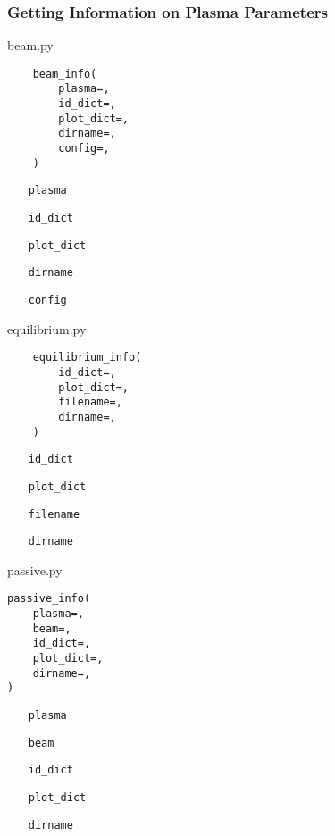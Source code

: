 \documentclass[../../main.tex]{subfiles}
\begin{document}
\subsubsection{Getting Information on Plasma Parameters}%
\label{sec:info}


beam.py

\begin{verbatim}
    beam_info(
        plasma=,
        id_dict=,
        plot_dict=,
        dirname=,
        config=,
    )
\end{verbatim}

\begin{itemize}[align=left]
    \item[\texttt{plasma}]
    \item[\texttt{id\_dict}]
    \item[\texttt{plot\_dict}]
    \item[\texttt{dirname}]
    \item[\texttt{config}]
\end{itemize}

equilibrium.py

\begin{verbatim}
    equilibrium_info(
        id_dict=,
        plot_dict=,
        filename=,
        dirname=,
    )
\end{verbatim}

\begin{itemize}[align=left]
    \item[\texttt{id\_dict}]
    \item[\texttt{plot\_dict}]
    \item[\texttt{filename}]
    \item[\texttt{dirname}]
\end{itemize}

passive.py

\begin{verbatim}
passive_info(
    plasma=,
    beam=,
    id_dict=,
    plot_dict=,
    dirname=,
)
\end{verbatim}

\begin{itemize}[align=left]
    \item[\texttt{plasma}]
    \item[\texttt{beam}]
    \item[\texttt{id\_dict}]
    \item[\texttt{plot\_dict}]
    \item[\texttt{dirname}]
\end{itemize}
\end{document}
